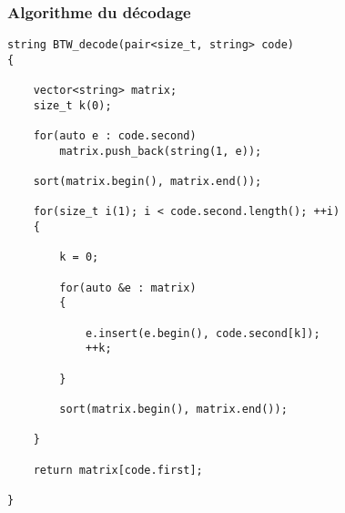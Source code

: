 \subsubsection{Algorithme du décodage}
\begin{verbatim}
string BTW_decode(pair<size_t, string> code)
{
	
	vector<string> matrix;
	size_t k(0);
	
	for(auto e : code.second)
		matrix.push_back(string(1, e));
		
	sort(matrix.begin(), matrix.end());
	
	for(size_t i(1); i < code.second.length(); ++i)
	{
		
		k = 0;
		
		for(auto &e : matrix)
		{
			
			e.insert(e.begin(), code.second[k]);
			++k;
			
		}

		sort(matrix.begin(), matrix.end());
		
	}

	return matrix[code.first];
	
}
\end{verbatim}